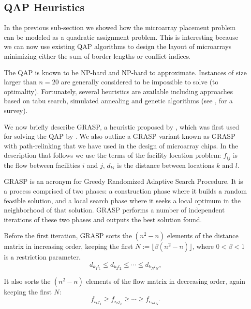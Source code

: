 \documentclass{bioinfo}
\begin{document}
\subsection{QAP Heuristics}

In the previous sub-section we showed how the microarray placement problem can be modeled as a quadratic assignment problem. This is interesting because we can now use existing QAP algorithms to design the layout of microarrays minimizing either the sum of border lengths or conflict indices. 

The QAP is known to be NP-hard and NP-hard to approximate. Instances of size
larger than $n = 20$ are generally considered to be impossible to solve (to
optimality). Fortunately, several heuristics are available including
approaches based on tabu search, simulated annealing and genetic algorithms
(see \citealp{CELA98}, for a survey).

We now briefly describe GRASP, a heuristic proposed by \citet{FEO95}, which
was first used for solving the QAP by \citet{LI94}. We also outline a GRASP
variant known as GRASP with path-relinking \citep{OLIVEIRA04} that we have
used in the design of microarray chips. In the description that follows we use
the terms of the facility location problem: $f_{ij}$ is the flow between
facilities $i$ and $j$, $d_{kl}$ is the distance between locations $k$ and
$l$.

GRASP is an acronym for Greedy Randomized Adaptive Search Procedure. It is a
process comprised of two phases: a construction phase where it builds a random
feasible solution, and a local search phase where it seeks a local optimum in
the neighborhood of that solution. GRASP performs a number of independent
iterations of these two phases and outputs the best solution found.

Before the first iteration, GRASP sorts the $(n^2 - n)$ elements of the
distance matrix in increasing order, keeping the first $N:= \lfloor \beta (n^2 -
n) \rfloor$, where $0 < \beta < 1$ is a restriction parameter.
\begin{displaymath}
d_{k_1 l_1} \le d_{k_2 l_2} \le \cdots \le d_{k_N l_N},
\end{displaymath}

 It also sorts the $(n^2 - n)$ elements of the flow matrix in decreasing order, again keeping the first $N$:
\begin{displaymath}
f_{i_1 j_1} \ge f_{i_2 j_2} \ge \cdots \ge f_{i_N j_N}.
\end{displaymath}
\end{document}
